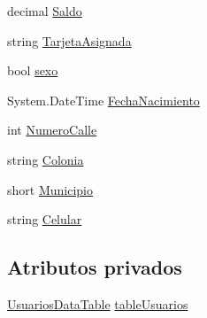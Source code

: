 \begin{DoxyCompactItemize}
\item 
decimal \hyperlink{class_proyecto___integrador__3_1_1ds_usuarios_1_1_usuarios_row_a8767d20d2bfa9f4e265f9bb2fb38fffd}{Saldo}
\item 
string \hyperlink{class_proyecto___integrador__3_1_1ds_usuarios_1_1_usuarios_row_aa22b95dee1aa553d36348fd272f7bf51}{Tarjeta\-Asignada}
\item 
bool \hyperlink{class_proyecto___integrador__3_1_1ds_usuarios_1_1_usuarios_row_a459ef01bf05692c7b43e376b3d6620b5}{sexo}
\item 
System.\-Date\-Time \hyperlink{class_proyecto___integrador__3_1_1ds_usuarios_1_1_usuarios_row_afa3832e8eeb4e9b652518de75e15b432}{Fecha\-Nacimiento}
\item 
int \hyperlink{class_proyecto___integrador__3_1_1ds_usuarios_1_1_usuarios_row_aa0af07f9536d8af14cabf3e7c7db4055}{Numero\-Calle}
\item 
string \hyperlink{class_proyecto___integrador__3_1_1ds_usuarios_1_1_usuarios_row_a799b567271f5d75af1532e54ce6df2d7}{Colonia}
\item 
short \hyperlink{class_proyecto___integrador__3_1_1ds_usuarios_1_1_usuarios_row_a041ccccf07ecbeb1feb041650c93be2a}{Municipio}
\item 
string \hyperlink{class_proyecto___integrador__3_1_1ds_usuarios_1_1_usuarios_row_abed4782f1967d4f2fefeb7f8c23d4edb}{Celular}
\end{DoxyCompactItemize}
\subsection*{Atributos privados}
\begin{DoxyCompactItemize}
\item 
\hyperlink{class_proyecto___integrador__3_1_1ds_usuarios_1_1_usuarios_data_table}{Usuarios\-Data\-Table} \hyperlink{class_proyecto___integrador__3_1_1ds_usuarios_1_1_usuarios_row_aafda5a6bdd7b0b2149e77517e78f56d2}{table\-Usuarios}
\end{DoxyCompactItemize}


